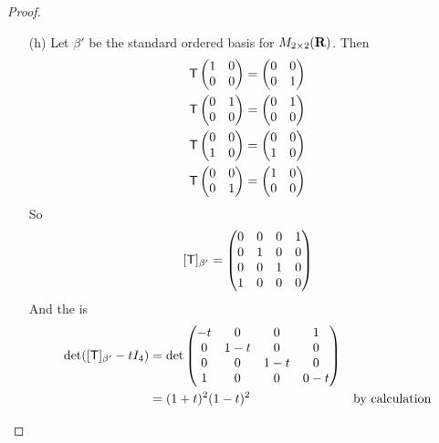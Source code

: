 \begin{proof}
\begin{enumerate}
\item[(h)] Let \(\beta'\) be the standard ordered basis for \(M_{2 \times 2}(\mathbf{R})\).
Then
\begin{align*}
    \textsf{T} \begin{pmatrix} 1 & 0 \\ 0 & 0 \end{pmatrix} & = \begin{pmatrix} 0 & 0 \\ 0 & 1 \end{pmatrix} \\
    \textsf{T} \begin{pmatrix} 0 & 1 \\ 0 & 0 \end{pmatrix} & = \begin{pmatrix} 0 & 1 \\ 0 & 0 \end{pmatrix} \\
    \textsf{T} \begin{pmatrix} 0 & 0 \\ 1 & 0 \end{pmatrix} & = \begin{pmatrix} 0 & 0 \\ 1 & 0 \end{pmatrix} \\
    \textsf{T} \begin{pmatrix} 0 & 0 \\ 0 & 1 \end{pmatrix} & = \begin{pmatrix} 1 & 0 \\ 0 & 0 \end{pmatrix}
\end{align*}
So
\[
    [\textsf{T}]_{\beta'} = \begin{pmatrix}
        0 & 0 & 0 & 1 \\
        0 & 1 & 0 & 0 \\
        0 & 0 & 1 & 0 \\
        1 & 0 & 0 & 0
    \end{pmatrix}
\]
And the \CPOLY{} is
\begin{align*}
    \det([\T]_{\beta'} - t I_4)
    & = \det \begin{pmatrix}
        -t & 0 & 0 & 1 \\
        0 & 1-t & 0 & 0 \\
        0 & 0 & 1-t & 0 \\
        1 & 0 & 0 & 0-t
    \end{pmatrix} \\
    & = (1+t)^2(1-t)^2 & \text{by calculation}

\end{align*}
\end{enumerate}
\end{proof}
